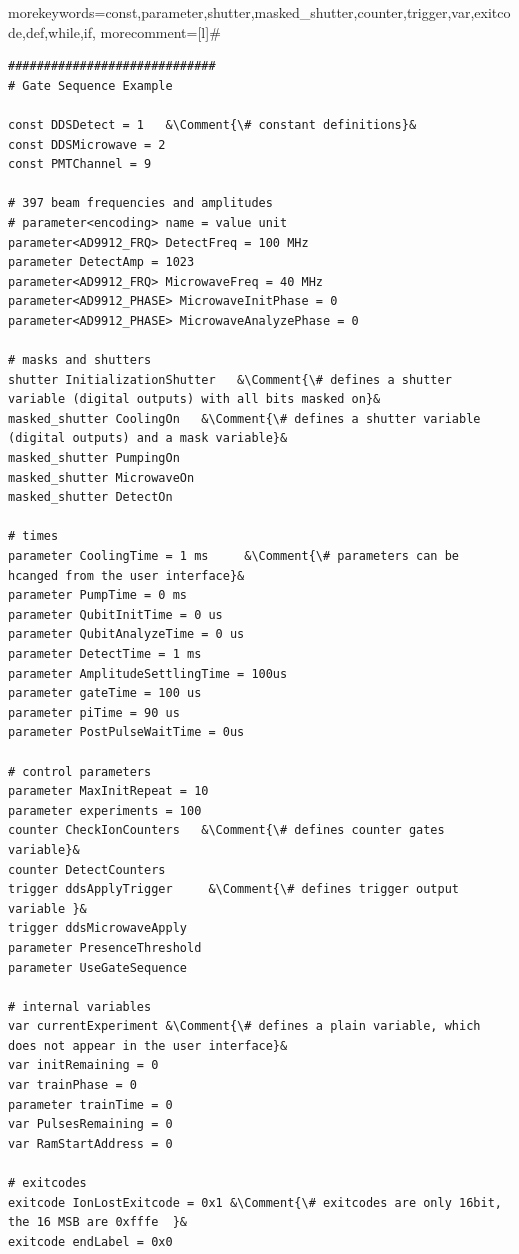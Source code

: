 \documentclass[11pt]{scrartcl}
\begin{document}
  { morekeywords={const,parameter,shutter,masked_shutter,counter,trigger,var,exitcode,def,while,if},
 morecomment=[l]{\#}
}
\newcommand*{\Comment}[1]{\hfill\makebox[0.5\textwidth][l]{\parbox{0.5\textwidth}{\color{green}#1}}}%
\begin{lstlisting}
#############################
# Gate Sequence Example

const DDSDetect = 1   &\Comment{\# constant definitions}&
const DDSMicrowave = 2
const PMTChannel = 9

# 397 beam frequencies and amplitudes
# parameter<encoding> name = value unit
parameter<AD9912_FRQ> DetectFreq = 100 MHz
parameter DetectAmp = 1023
parameter<AD9912_FRQ> MicrowaveFreq = 40 MHz
parameter<AD9912_PHASE> MicrowaveInitPhase = 0
parameter<AD9912_PHASE> MicrowaveAnalyzePhase = 0

# masks and shutters
shutter InitializationShutter   &\Comment{\# defines a shutter variable (digital outputs) with all bits masked on}&
masked_shutter CoolingOn   &\Comment{\# defines a shutter variable (digital outputs) and a mask variable}&
masked_shutter PumpingOn
masked_shutter MicrowaveOn
masked_shutter DetectOn

# times
parameter CoolingTime = 1 ms     &\Comment{\# parameters can be hcanged from the user interface}&
parameter PumpTime = 0 ms
parameter QubitInitTime = 0 us
parameter QubitAnalyzeTime = 0 us
parameter DetectTime = 1 ms
parameter AmplitudeSettlingTime = 100us
parameter gateTime = 100 us
parameter piTime = 90 us
parameter PostPulseWaitTime = 0us

# control parameters
parameter MaxInitRepeat = 10
parameter experiments = 100
counter CheckIonCounters   &\Comment{\# defines counter gates variable}&
counter DetectCounters
trigger ddsApplyTrigger     &\Comment{\# defines trigger output variable }&
trigger ddsMicrowaveApply
parameter PresenceThreshold 
parameter UseGateSequence

# internal variables
var currentExperiment &\Comment{\# defines a plain variable, which does not appear in the user interface}&
var initRemaining = 0
var trainPhase = 0
parameter trainTime = 0
var PulsesRemaining = 0
var RamStartAddress = 0

# exitcodes
exitcode IonLostExitcode = 0x1 &\Comment{\# exitcodes are only 16bit, the 16 MSB are 0xfffe  }&
exitcode endLabel = 0x0


\end{lstlisting}
\end{document}
